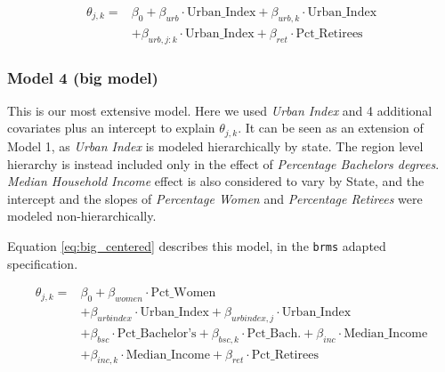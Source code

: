 \documentclass[12pt]{article}
\begin{document}
\begin{equation} \label{eq:nested_centered}
	\begin{aligned}
		\theta_{j,k} =    &\beta_0 + \beta_{urb} \cdot \text{Urban\_Index} + \beta_{urb,k} \cdot \text{Urban\_Index} \\
		&+ \beta_{urb,j:k} \cdot \text{Urban\_Index} + \beta_{ret} \cdot \text{Pct\_Retirees}
	\end{aligned}
\end{equation}



\subsubsection*{Model 4 (big model)}


This is our most extensive model.
Here we used \textit{Urban Index} and 4 additional covariates plus an intercept to explain $\theta_{j,k}$.
It can be seen as an extension of Model 1, as \textit{Urban Index} is modeled hierarchically by state. The region level hierarchy is instead included only in the effect of \textit{Percentage Bachelors degrees}.
\textit{Median Household Income} effect is also considered to vary by State, and the intercept and the slopes of \textit{Percentage Women} and \textit{Percentage Retirees} were modeled non-hierarchically.

Equation \ref{eq:big_centered} describes this model, in the \verb|brms| adapted specification.

\begin{equation} \label{eq:big_centered}
	\begin{aligned}
		\theta_{j,k} = & \beta_0 + \beta_{women} \cdot \text{Pct\_Women}                                                                              \\
		& + \beta_{urbindex} \cdot \text{Urban\_Index} + \beta_{urbindex, j} \cdot \text{Urban\_Index}                                 \\
		& + \beta_{bsc} \cdot \text{Pct\_Bachelor's} + \beta_{bsc,k} \cdot \text{Pct\_Bach.} + \beta_{inc} \cdot \text{Median\_Income} \\
		& + \beta_{inc,k} \cdot \text{Median\_Income} + \beta_{ret} \cdot \text{Pct\_Retirees}
	\end{aligned}
\end{equation}
\end{document}
